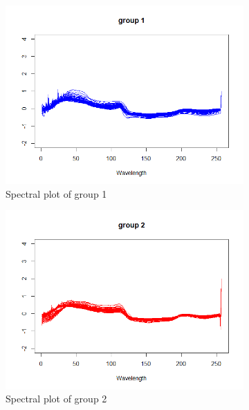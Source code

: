 \documentclass[12pt]{article}
\begin{document}
\begin{figure}[h]
  \centering
  \begin{subfigure}[b]{0.35\linewidth}
      \centering
      \includegraphics[width=\textwidth]{../images/project2/group1_wavelength.png}
   \caption{Spectral plot of group 1}\label{fig:group1_wavelength}
  \end{subfigure}%
  \begin{subfigure}[b]{0.35\linewidth}
      \centering
   \includegraphics[width=\textwidth]{../images/project2/group2_wavelength.png}
   \caption{Spectral plot of group 2}\label{fig:group2_wavelength}
  \end{subfigure} \\%
  \begin{subfigure}[b]{0.35\linewidth}

\end{subfigure}
\end{figure}
\end{document}
